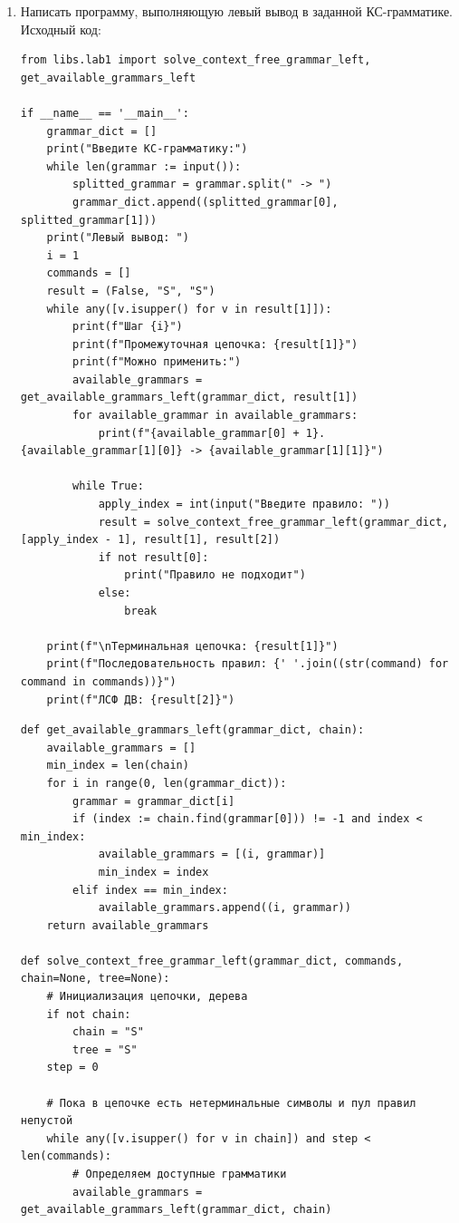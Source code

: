 \documentclass[a4paper,14pt]{extarticle}
\begin{document}
\begin{enumerate}[1.]
    \item Написать программу, выполняющую левый вывод в заданной
          КС-грамматике.\\
          Исходный код:
          \begin{verbatim}
from libs.lab1 import solve_context_free_grammar_left, get_available_grammars_left

if __name__ == '__main__':
    grammar_dict = []
    print("Введите КС-грамматику:")
    while len(grammar := input()):
        splitted_grammar = grammar.split(" -> ")
        grammar_dict.append((splitted_grammar[0], splitted_grammar[1]))
    print("Левый вывод: ")
    i = 1
    commands = []
    result = (False, "S", "S")
    while any([v.isupper() for v in result[1]]):
        print(f"Шаг {i}")
        print(f"Промежуточная цепочка: {result[1]}")
        print(f"Можно применить:")
        available_grammars = get_available_grammars_left(grammar_dict, result[1])
        for available_grammar in available_grammars:
            print(f"{available_grammar[0] + 1}. {available_grammar[1][0]} -> {available_grammar[1][1]}")

        while True:
            apply_index = int(input("Введите правило: "))
            result = solve_context_free_grammar_left(grammar_dict, [apply_index - 1], result[1], result[2])
            if not result[0]:
                print("Правило не подходит")
            else:
                break

    print(f"\nТерминальная цепочка: {result[1]}")
    print(f"Последовательность правил: {' '.join((str(command) for command in commands))}")
    print(f"ЛСФ ДВ: {result[2]}")
\end{verbatim}
          \begin{verbatim}
def get_available_grammars_left(grammar_dict, chain):
    available_grammars = []
    min_index = len(chain)
    for i in range(0, len(grammar_dict)):
        grammar = grammar_dict[i]
        if (index := chain.find(grammar[0])) != -1 and index < min_index:
            available_grammars = [(i, grammar)]
            min_index = index
        elif index == min_index:
            available_grammars.append((i, grammar))
    return available_grammars

def solve_context_free_grammar_left(grammar_dict, commands, chain=None, tree=None):
    # Инициализация цепочки, дерева
    if not chain:
        chain = "S"
        tree = "S"
    step = 0

    # Пока в цепочке есть нетерминальные символы и пул правил непустой
    while any([v.isupper() for v in chain]) and step < len(commands):
        # Определяем доступные грамматики
        available_grammars = get_available_grammars_left(grammar_dict, chain)


\end{verbatim}
\end{enumerate}
\end{document}
